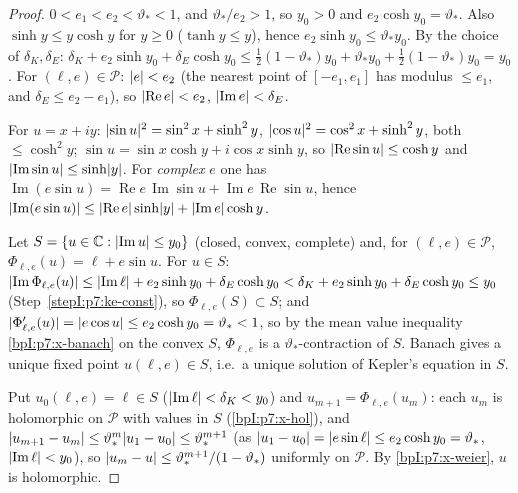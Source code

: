 \begin{proof}
\label{stepI:p7:ke-const} $0<e_1<e_2<\vartheta_*<1$, and $\vartheta_*/e_2>1$, so $y_0>0$ and $e_2\cosh y_0=\vartheta_*$. Also $\sinh y\le y\cosh y$ for $y\ge0$ ($\tanh y\le y$), hence $e_2\sinh y_0\le\vartheta_*y_0$. By the choice of $\delta_K,\delta_E$:
$\delta_K+e_2\sinh y_0+\delta_E\cosh y_0\le\tfrac12(1-\vartheta_*)y_0+\vartheta_*y_0+\tfrac12(1-\vartheta_*)y_0=y_0$. For $(\ell,e)\in\mathcal P$: $\lvert e\rvert<e_2$ (the nearest point of $[-e_1,e_1]$ has modulus $\le e_1$, and $\delta_E\le e_2-e_1$), so $\lvert \operatorname{Re}e\rvert<e_2$, $\lvert \operatorname{Im}e\rvert<\delta_E$.

\label{stepI:p7:ke-trig} For $u=x+iy$: $\lvert \sin u\rvert^2=\sin^2x+\sinh^2y$, $\lvert \cos u\rvert^2=\cos^2x+\sinh^2y$, both $\le\cosh^2y$; $\sin u=\sin x\cosh y+i\cos x\sinh y$, so $\lvert \operatorname{Re}\sin u\rvert\le\cosh y$ and $\lvert \operatorname{Im}\sin u\rvert\le\sinh\lvert y\rvert$. For \emph{complex} $e$ one has $\operatorname{Im}(e\sin u)=\operatorname{Re}e\,\operatorname{Im}\sin u+\operatorname{Im}e\,\operatorname{Re}\sin u$, hence $\lvert \operatorname{Im}(e\sin u)\rvert\le\lvert \operatorname{Re}e\rvert\sinh\lvert y\rvert+\lvert \operatorname{Im}e\rvert\cosh y$.

\label{stepI:p7:ke-contr} Let $S=\{u\in\mathbb{C}:\lvert \operatorname{Im}u\rvert\le y_0\}$ (closed, convex, complete) and, for $(\ell,e)\in\mathcal P$, $\Phi_{\ell,e}(u)=\ell+e\sin u$. For $u\in S$:
$\lvert \operatorname{Im}\Phi_{\ell,e}(u)\rvert\le\lvert \operatorname{Im}\ell\rvert+e_2\sinh y_0+\delta_E\cosh y_0<\delta_K+e_2\sinh y_0+\delta_E\cosh y_0\le y_0$ (Step~\ref{stepI:p7:ke-const}), so $\Phi_{\ell,e}(S)\subset S$; and $\lvert \Phi_{\ell,e}'(u)\rvert=\lvert e\cos u\rvert\le e_2\cosh y_0=\vartheta_*<1$,
so by the mean value inequality \ref{bpI:p7:x-banach} on the convex $S$, $\Phi_{\ell,e}$ is a $\vartheta_*$-contraction of $S$. Banach gives a unique fixed point $u(\ell,e)\in S$, i.e.\ a unique solution of Kepler's equation in $S$.

\label{stepI:p7:ke-hol} Put $u_0(\ell,e)=\ell\in S$ ($\lvert \operatorname{Im}\ell\rvert<\delta_K<y_0$) and $u_{m+1}=\Phi_{\ell,e}(u_m)$: each $u_m$ is holomorphic on $\mathcal P$ with values in $S$ (\ref{bpI:p7:x-hol}), and
$\lvert u_{m+1}-u_m\rvert\le\vartheta_*^m\lvert u_1-u_0\rvert\le\vartheta_*^{m+1}$ (as $\lvert u_1-u_0\rvert=\lvert e\sin\ell\rvert\le e_2\cosh y_0=\vartheta_*$, $\lvert \operatorname{Im}\ell\rvert<y_0$), so $\lvert u_m-u\rvert\le\vartheta_*^{m+1}/(1-\vartheta_*)$ uniformly on $\mathcal P$.
By \ref{bpI:p7:x-weier}, $u$ is holomorphic.


\end{proof}
